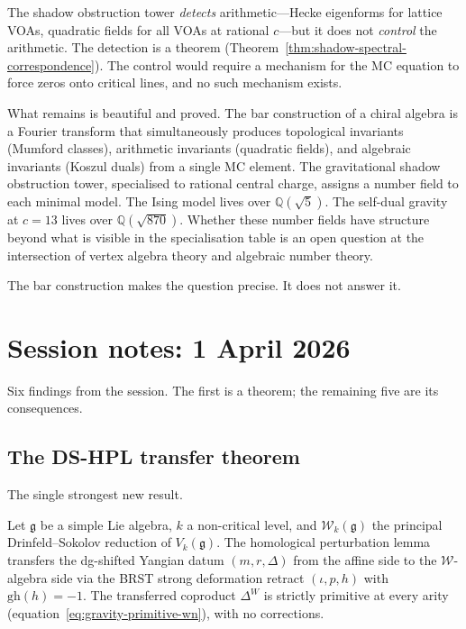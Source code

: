 \documentclass[11pt]{article}
\newcommand{\cW}{\mathcal{W}}
\newcommand{\fg}{\mathfrak{g}}
\newcommand{\Q}{\mathbb{Q}}
\begin{document}
The shadow obstruction tower \emph{detects} arithmetic---Hecke eigenforms
for lattice VOAs, quadratic fields for all VOAs at rational $c$---but
it does not \emph{control} the arithmetic.  The detection is a
theorem (Theorem~\ref{thm:shadow-spectral-correspondence}).  The
control would require a mechanism for the MC equation to force
zeros onto critical lines, and no such mechanism exists.

What remains is beautiful and proved.  The bar construction of a
chiral algebra is a Fourier transform that simultaneously produces
topological invariants (Mumford classes), arithmetic invariants
(quadratic fields), and algebraic invariants (Koszul duals) from
a single MC element.  The gravitational shadow obstruction tower, specialised
to rational central charge, assigns a number field to each minimal
model.  The Ising model lives over $\Q(\sqrt{5})$.  The self-dual
gravity at $c = 13$ lives over $\Q(\sqrt{870})$.  Whether these
number fields have structure beyond what is visible in the
specialisation table is an open question at the intersection of
vertex algebra theory and algebraic number theory.

The bar construction makes the question precise.  It does not
answer it.


\section{Session notes: 1 April 2026}
\label{sec:session-2026-04-01}

Six findings from the session.  The first is a theorem; the
remaining five are its consequences.


\subsection{The DS-HPL transfer theorem}
\label{sec:ds-hpl-transfer}

The single strongest new result.

\begin{theorem}
\label{thm:ds-hpl-transfer-wn}
Let $\fg$ be a simple Lie algebra, $k$ a non-critical level, and
$\cW_k(\fg)$ the principal Drinfeld--Sokolov reduction of
$V_k(\fg)$.  The homological perturbation lemma transfers the
dg-shifted Yangian datum $(m, r, \Delta)$ from the affine side to
the $\cW$-algebra side via the BRST strong deformation retract
$(\iota, p, h)$ with $\mathrm{gh}(h) = -1$.  The transferred
coproduct $\Delta^W$ is strictly primitive at every arity
(equation~\eqref{eq:gravity-primitive-wn}), with no corrections.
\end{theorem}
\end{document}
